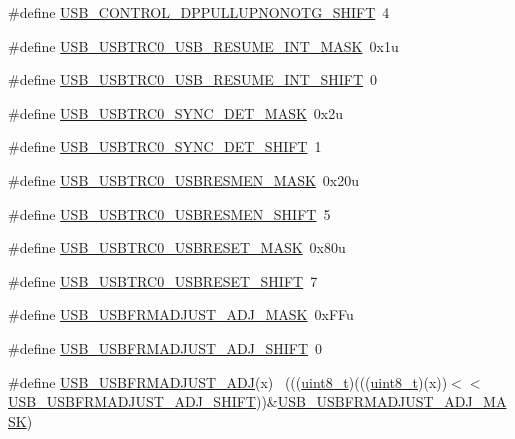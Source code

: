 \begin{DoxyCompactItemize}
\item 
\#define \hyperlink{group___u_s_b___register___masks_ga5bae9683a5ae7c48617b8d24a35786ce}{U\+S\+B\+\_\+\+C\+O\+N\+T\+R\+O\+L\+\_\+\+D\+P\+P\+U\+L\+L\+U\+P\+N\+O\+N\+O\+T\+G\+\_\+\+S\+H\+I\+FT}~4
\item 
\#define \hyperlink{group___u_s_b___register___masks_ga9c943cc95fdf52fa40311292f2801518}{U\+S\+B\+\_\+\+U\+S\+B\+T\+R\+C0\+\_\+\+U\+S\+B\+\_\+\+R\+E\+S\+U\+M\+E\+\_\+\+I\+N\+T\+\_\+\+M\+A\+SK}~0x1u
\item 
\#define \hyperlink{group___u_s_b___register___masks_ga48af1176ed5d811c299eb123f934425d}{U\+S\+B\+\_\+\+U\+S\+B\+T\+R\+C0\+\_\+\+U\+S\+B\+\_\+\+R\+E\+S\+U\+M\+E\+\_\+\+I\+N\+T\+\_\+\+S\+H\+I\+FT}~0
\item 
\#define \hyperlink{group___u_s_b___register___masks_ga2e2f3b4bb79885ed92d75c9f86d42e23}{U\+S\+B\+\_\+\+U\+S\+B\+T\+R\+C0\+\_\+\+S\+Y\+N\+C\+\_\+\+D\+E\+T\+\_\+\+M\+A\+SK}~0x2u
\item 
\#define \hyperlink{group___u_s_b___register___masks_ga986ea3386acad15ab845a8c5d9644c9e}{U\+S\+B\+\_\+\+U\+S\+B\+T\+R\+C0\+\_\+\+S\+Y\+N\+C\+\_\+\+D\+E\+T\+\_\+\+S\+H\+I\+FT}~1
\item 
\#define \hyperlink{group___u_s_b___register___masks_gaf236b1fdfa7f7dab54961c74538dfb75}{U\+S\+B\+\_\+\+U\+S\+B\+T\+R\+C0\+\_\+\+U\+S\+B\+R\+E\+S\+M\+E\+N\+\_\+\+M\+A\+SK}~0x20u
\item 
\#define \hyperlink{group___u_s_b___register___masks_ga4b62f293769f60cae99319d6bb1299e8}{U\+S\+B\+\_\+\+U\+S\+B\+T\+R\+C0\+\_\+\+U\+S\+B\+R\+E\+S\+M\+E\+N\+\_\+\+S\+H\+I\+FT}~5
\item 
\#define \hyperlink{group___u_s_b___register___masks_ga3b307f8358be6942775121b6a92243ab}{U\+S\+B\+\_\+\+U\+S\+B\+T\+R\+C0\+\_\+\+U\+S\+B\+R\+E\+S\+E\+T\+\_\+\+M\+A\+SK}~0x80u
\item 
\#define \hyperlink{group___u_s_b___register___masks_gab20fcb9276a34cbbd33ac0364c419f13}{U\+S\+B\+\_\+\+U\+S\+B\+T\+R\+C0\+\_\+\+U\+S\+B\+R\+E\+S\+E\+T\+\_\+\+S\+H\+I\+FT}~7
\item 
\#define \hyperlink{group___u_s_b___register___masks_ga3bbdc3dbdf46947a16a7b4429ad9a0c7}{U\+S\+B\+\_\+\+U\+S\+B\+F\+R\+M\+A\+D\+J\+U\+S\+T\+\_\+\+A\+D\+J\+\_\+\+M\+A\+SK}~0x\+F\+Fu
\item 
\#define \hyperlink{group___u_s_b___register___masks_ga81985f8c59f9aa0c0340a70136b55098}{U\+S\+B\+\_\+\+U\+S\+B\+F\+R\+M\+A\+D\+J\+U\+S\+T\+\_\+\+A\+D\+J\+\_\+\+S\+H\+I\+FT}~0
\item 
\#define \hyperlink{group___u_s_b___register___masks_gaf720ebb728601eb6b28984ed63b88b78}{U\+S\+B\+\_\+\+U\+S\+B\+F\+R\+M\+A\+D\+J\+U\+S\+T\+\_\+\+A\+DJ}(x)                                ~(((\hyperlink{_p_e___types_8h_aba7bc1797add20fe3efdf37ced1182c5}{uint8\+\_\+t})(((\hyperlink{_p_e___types_8h_aba7bc1797add20fe3efdf37ced1182c5}{uint8\+\_\+t})(x))$<$$<$\hyperlink{group___u_s_b___register___masks_ga81985f8c59f9aa0c0340a70136b55098}{U\+S\+B\+\_\+\+U\+S\+B\+F\+R\+M\+A\+D\+J\+U\+S\+T\+\_\+\+A\+D\+J\+\_\+\+S\+H\+I\+FT}))\&\hyperlink{group___u_s_b___register___masks_ga3bbdc3dbdf46947a16a7b4429ad9a0c7}{U\+S\+B\+\_\+\+U\+S\+B\+F\+R\+M\+A\+D\+J\+U\+S\+T\+\_\+\+A\+D\+J\+\_\+\+M\+A\+SK})
$$
\end{DoxyCompactItemize}
